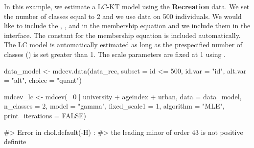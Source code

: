 In this example, we estimate a LC-KT model using the \textbf{Recreation}
data. We set the number of classes equal to 2 and we use data on 500
individuals. We would like to include the ,
, and  in the membership equation and we
include them in the  interface. The constant for the
membership equation is included automatically. The LC model is
automatically estimated as long as the prespecified number of classes
() is set greater than 1. The scale parameters are
fixed at 1 using .

\begin{Schunk}
\begin{Sinput}
data_model <- mdcev.data(data_rec, subset = id <= 500,
                       id.var = "id",
                       alt.var = "alt",
                       choice = "quant")  

mdcev_lc <- mdcev(~ 0 | university + ageindex + urban,
                  data = data_model,
                  n_classes = 2,
                  model = "gamma",
                  fixed_scale1 = 1,
                  algorithm = "MLE",
                  print_iterations = FALSE)
\end{Sinput}
\begin{Soutput}
#> Error in chol.default(-H) : 
#>   the leading minor of order 43 is not positive definite
\end{Soutput}
\end{Schunk}

